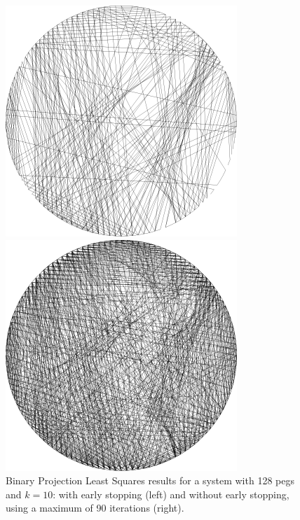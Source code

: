 \begin{figure}[H]
    \centering
    \begin{minipage}{0.2\linewidth}
        \centering
        \includegraphics[width=\linewidth]{images/bpls/bpls_earlystopping.png}
    \end{minipage}
    \begin{minipage}{0.2\linewidth}
        \centering
        \includegraphics[width=\linewidth]{images/bpls/bpls.png}
    \end{minipage}
    \caption{Binary Projection Least Squares results for a system with 128 pegs and \(k=10\): with early stopping (left) and without early stopping, using a maximum of 90 iterations (right).}
    \label{fig:bpls_output}
\end{figure}

